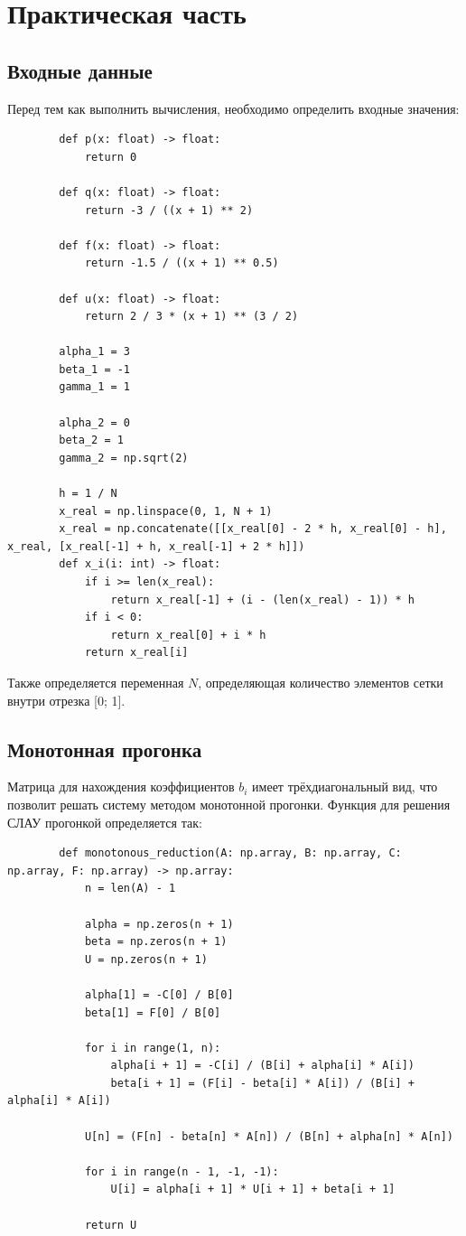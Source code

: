 \documentclass[a4paper,14pt]{extarticle}
\begin{document}
    \newpage
    \section{Практическая часть}
    \subsection{Входные данные}

    Перед тем как выполнить вычисления, необходимо определить входные значения:
    \begin{verbatim}
        def p(x: float) -> float:
            return 0

        def q(x: float) -> float:
            return -3 / ((x + 1) ** 2)

        def f(x: float) -> float:
            return -1.5 / ((x + 1) ** 0.5)

        def u(x: float) -> float:
            return 2 / 3 * (x + 1) ** (3 / 2)

        alpha_1 = 3
        beta_1 = -1
        gamma_1 = 1

        alpha_2 = 0
        beta_2 = 1
        gamma_2 = np.sqrt(2)

        h = 1 / N
        x_real = np.linspace(0, 1, N + 1)
        x_real = np.concatenate([[x_real[0] - 2 * h, x_real[0] - h], x_real, [x_real[-1] + h, x_real[-1] + 2 * h]])
        def x_i(i: int) -> float:
            if i >= len(x_real):
                return x_real[-1] + (i - (len(x_real) - 1)) * h
            if i < 0:
                return x_real[0] + i * h
            return x_real[i]
    \end{verbatim}

    Также определяется переменная $N$, определяющая количество элементов сетки внутри отрезка [0; 1].

    \subsection{Монотонная прогонка}

    Матрица для нахождения коэффициентов $b_i$ имеет трёхдиагональный вид, что позволит решать систему методом монотонной прогонки.
    Функция для решения СЛАУ прогонкой определяется так:
    \begin{verbatim}
        def monotonous_reduction(A: np.array, B: np.array, C: np.array, F: np.array) -> np.array:
            n = len(A) - 1

            alpha = np.zeros(n + 1)
            beta = np.zeros(n + 1)
            U = np.zeros(n + 1)

            alpha[1] = -C[0] / B[0]
            beta[1] = F[0] / B[0]

            for i in range(1, n):
                alpha[i + 1] = -C[i] / (B[i] + alpha[i] * A[i])
                beta[i + 1] = (F[i] - beta[i] * A[i]) / (B[i] + alpha[i] * A[i])

            U[n] = (F[n] - beta[n] * A[n]) / (B[n] + alpha[n] * A[n])

            for i in range(n - 1, -1, -1):
                U[i] = alpha[i + 1] * U[i + 1] + beta[i + 1]

            return U
    \end{verbatim}
\end{document}
